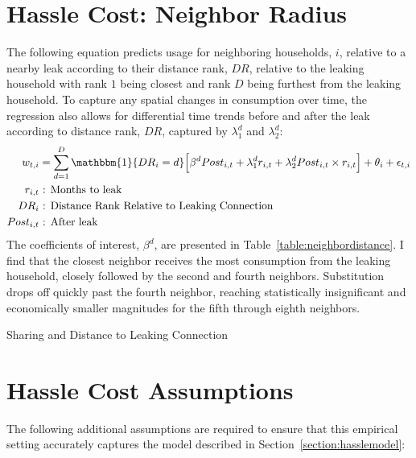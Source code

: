 \documentclass[12pt]{article}
\begin{document}
\begin{appendices}
\section{Hassle Cost: Neighbor Radius}\label{appendix:sharingneighbor}

The following equation predicts usage for neighboring households, $i$, relative to a nearby leak according to their distance rank, $DR$, relative to the leaking household with rank $1$ being closest and rank $D$ being furthest from the leaking household.  To capture any spatial changes in consumption over time, the regression also allows for differential time trends before and after the leak according to distance rank, $DR$, captured by $\lambda^{d}_{1}$ and $\lambda^{d}_{2}$:
\begin{align*}
	w_{t,i} &= \sum_{d=1}^{D} \mathbbm{1}\{DR_{i}=d\} \Big [ \beta^{d} Post_{i,t} +  \lambda^{d}_{1} r_{i,t} + \lambda^{d}_{2} Post_{i,t} \times r_{i,t} \Big ] + \theta_{i}  + \epsilon_{t,i}\\
r_{i,t} &\text{ : Months to leak} \\
DR_{i} &\text{ : Distance Rank Relative to Leaking Connection} \\
Post_{i,t} &\text{ : After leak}
\end{align*}
The coefficients of interest, $\beta^{d}$, are presented in Table~\ref{table:neighbordistance}.  I find that the closest neighbor receives the most consumption from the leaking household, closely followed by the second and fourth neighbors.  Substitution drops off quickly past the fourth neighbor, reaching statistically insignificant and economically smaller magnitudes for the fifth through eighth neighbors.  
\begin{table}
\caption{Sharing and Distance to Leaking Connection}\label{table:neighbordistance}
\centering

\end{table}


\section{Hassle Cost Assumptions}\label{appendix:sharingcostassumptions}

The following additional assumptions are required to ensure that this empirical setting accurately captures the model described in Section~\ref{section:hasslemodel}:
\begin{enumerate}


\end{enumerate}
\end{appendices}
\end{document}
